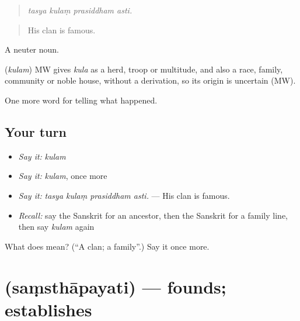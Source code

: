 \begin{quote}
   
\end{quote}

\begin{quote}
\emph{tasya kulaṃ prasiddham asti.}
\end{quote}

\begin{quote}
His clan is famous.
\end{quote}

A neuter noun.

\begin{cousinweb}
\textbf{} (\emph{kulam}) MW gives \emph{kula} as a herd, troop or multitude, and also a race, family, community or noble house, without a derivation, so its origin is uncertain (MW).
\end{cousinweb}

\begin{grammarlens}[title={What you've built}]
One more word for telling what happened.
\end{grammarlens}

\subsection*{Your turn}
\begin{itemize}
\raggedright
  \item \emph{Say it:} \emph{kulam}
  \item \emph{Say it:} \emph{kulam}, once more
  \item \emph{Say it:} \emph{tasya kulaṃ prasiddham asti.} — His clan is famous.
  \item \emph{Recall:} say the Sanskrit for an ancestor, then the Sanskrit for a family line, then say \emph{kulam} again
\end{itemize}

\begin{tcolorbox}[breakable,colback=teal!4,colframe=teal!35!black,title={Before you move on}]
What does  mean? (\textquotedblleft{}A clan; a family\textquotedblright{}.) Say it once more.
\end{tcolorbox}
\section[\texorpdfstring{\sk{संस्थापयति} (saṃsthāpayati)}{संस्थापयति (saṃsthāpayati)}]{ (saṃsthāpayati) — founds; establishes}

